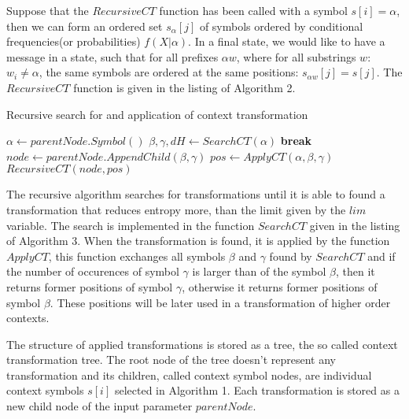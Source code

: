 \documentclass[smallabstract,smallcaptions]{dccpaper}
\begin{document}

Suppose that the $RecursiveCT$ function has been called with a symbol $s[i]=\alpha$, then  we can form an ordered set $s_\alpha[j]$ of symbols ordered by conditional frequencies(or probabilities) $f(X|\alpha)$. 
In a final state, we would like to have a message in a state, such that for all prefixes $\alpha w$, where for all substrings $w$: $w_i\neq \alpha$, the same symbols are ordered at the same positions: $s_{\alpha w}[j] = s[j]$.
The $RecursiveCT$ function is given in the listing of Algorithm 2.

\begin{algorithm}
\caption{Recursive search for and application of context transformation}
\label{alg:max-ent-rec}
\begin{algorithmic}
\State $\alpha \gets parentNode.Symbol()$
\Repeat
\State $\beta,\gamma,dH \gets SearchCT(\alpha)$
\State \textbf{break}
\EndIf
\State $node \gets parentNode.AppendChild(\beta, \gamma)$
\State $pos \gets ApplyCT(\alpha,\beta,\gamma)$
\State $RecursiveCT(node, pos)$
\EndFunction
\end{algorithmic}
\end{algorithm}

The recursive algorithm searches for transformations until it is able to found a transformation that reduces entropy more, than the limit given by the $lim$ variable. The search is implemented in the function $SearchCT$ given in the listing of Algorithm 3. 
When the transformation is found, it is applied by the function $ApplyCT$, this function exchanges all symbols $\beta$ and $\gamma$ found by $SearchCT$ and if the number of occurences of symbol $\gamma$ is larger than of the symbol $\beta$, then it returns former positions of symbol $\gamma$, otherwise it returns former positions of symbol $\beta$. These positions will be later used in a transformation of higher order contexts.

The structure of applied transformations is stored as a tree, the so called context transformation tree. The root node of the tree doesn't represent any transformation and its children, called context symbol nodes, are individual context symbols $s[i]$ selected in Algorithm 1. Each transformation is stored as a new child node of the input parameter $parentNode$.
\end{document}
